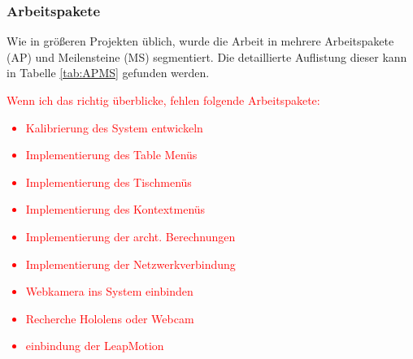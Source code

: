 \subsubsection{Arbeitspakete}
Wie in größeren Projekten üblich, wurde die Arbeit in mehrere Arbeitspakete (AP) und Meilensteine (MS) segmentiert. Die detaillierte Auflistung dieser kann in Tabelle \ref{tab:APMS} gefunden werden.
\textcolor{red}{Wenn ich das richtig überblicke, fehlen folgende Arbeitspakete: \begin{itemize}
		\item Kalibrierung des System entwickeln
		\item Implementierung des Table Menüs
		\item Implementierung des Tischmenüs
		\item Implementierung des Kontextmenüs
		\item Implementierung der archt. Berechnungen
		\item Implementierung der Netzwerkverbindung 
		\item Webkamera ins System einbinden
		\item  Recherche Hololens oder Webcam
		\item einbindung der LeapMotion  
\end{itemize}}
